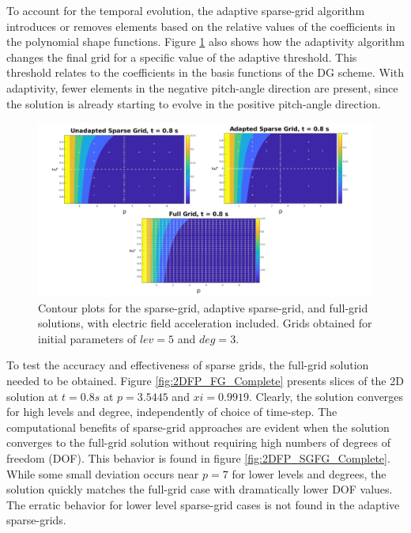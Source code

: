 \documentclass[preprint,11pt]{elsarticle}
\begin{document}
To account for the temporal evolution, the adaptive sparse-grid algorithm introduces or removes elements based on the relative values of the coefficients in the polynomial shape functions. Figure \ref{fig:2DAdaptContour} also shows how the adaptivity algorithm changes the final grid for a specific value of the adaptive threshold. This threshold relates to the coefficients in the basis functions of the DG scheme. With adaptivity, fewer elements in the negative pitch-angle direction are present, since the solution is already starting to evolve in the positive pitch-angle direction. 

\begin{figure}[H]
    \centering
    \includegraphics[width=1.1\textwidth]{FIGURES/2DContour_AdaptSG.jpg}
    \caption{Contour plots for the sparse-grid, adaptive sparse-grid, and full-grid solutions, with electric field acceleration included. Grids obtained for initial parameters of $lev = 5$ and $deg = 3$.}
    \label{fig:2DAdaptContour}
\end{figure}

To test the accuracy and effectiveness of sparse grids, the full-grid solution needed to be obtained. Figure \ref{fig:2DFP_FG_Complete} presents slices of the 2D solution at $t = 0.8 s$ at $p = 3.5445$ and $xi = 0.9919$. Clearly, the solution converges for high levels and degree, independently of choice of time-step. The computational benefits of sparse-grid approaches are evident when the solution converges to the full-grid solution without requiring high numbers of degrees of freedom (DOF). This behavior is found in figure \ref{fig:2DFP_SGFG_Complete}. While some small deviation occurs near $p = 7$ for lower levels and degrees, the solution quickly matches the full-grid case with dramatically lower DOF values. The erratic behavior for lower level sparse-grid cases is not found in the adaptive sparse-grids. 
    
\end{document}

